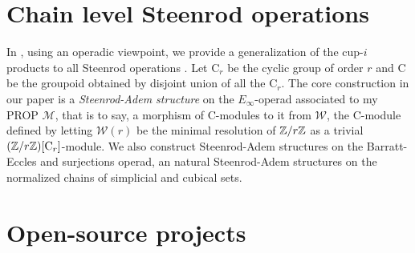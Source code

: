 \section{Chain level Steenrod operations}
In \cite{medina2020maysteenrod}, using an operadic viewpoint, we provide a generalization of the cup-$i$ products to all Steenrod operations \cite{steenrod1962cohomology}.
Let $\mathrm C_r$ be the cyclic group of order $r$ and $\mathrm C$ be the groupoid obtained by disjoint union of all the $\mathrm C_r$.
The core construction in our paper is a \textit{Steenrod-Adem structure} on the $E_\infty$-operad associated to my PROP $\mathcal M$, that is to say, a morphism of $\mathrm C$-modules to it from $\mathcal W$, the $\mathrm C$-module defined by letting $\mathcal W(r)$ be the minimal resolution of $\mathbb{Z}/r\mathbb{Z}$ as a trivial $(\mathbb{Z}/r\mathbb{Z})[\mathrm C_r]$-module.
We also construct Steenrod-Adem structures on the Barratt-Eccles and surjections operad, an natural Steenrod-Adem structures on the normalized chains of simplicial and cubical sets.



\section{Open-source projects}

